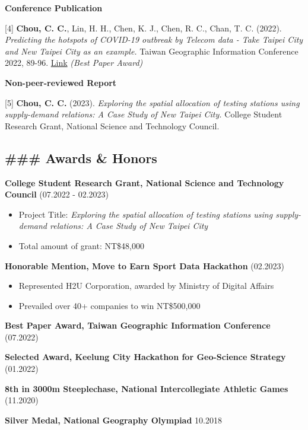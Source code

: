 \textbf{Conference Publication}

{[}4{]} \textbf{Chou, C. C.}, Lin, H. H., Chen, K. J., Chen, R. C.,
Chan, T. C. (2022). \emph{Predicting the hotspots of COVID-19 outbreak
by Telecom data - Take Taipei City and New Taipei City as an example.}
Taiwan Geographic Information Conference 2022, 89-96.
\href{https://drive.google.com/file/d/1KBwXkAsi8dmpPls-F3Lp8rqz5oc2JKWW/view}{Link}
\emph{(Best Paper Award)}

\textbf{Non-peer-reviewed Report}

{[}5{]} \textbf{Chou, C. C.} (2023). \emph{Exploring the spatial
allocation of testing stations using supply-demand relations: A Case
Study of New Taipei City.} College Student Research Grant, National
Science and Technology Council.

\subsection{\#\#\# Awards \& Honors}\label{awards-honors}

\textbf{College Student Research Grant, National Science and Technology
Council} (07.2022 - 02.2023)

\begin{itemize}
\item
  Project Title: \emph{Exploring the spatial allocation of testing
  stations using supply-demand relations: A Case Study of New Taipei
  City}
\item
  Total amount of grant: NT\$48,000
\end{itemize}

\textbf{Honorable Mention, Move to Earn Sport Data Hackathon} (02.2023)

\begin{itemize}
\item
  Represented H2U Corporation, awarded by Ministry of Digital Affairs
\item
  Prevailed over 40+ companies to win NT\$500,000
\end{itemize}

\textbf{Best Paper Award, Taiwan Geographic Information Conference}
(07.2022)

\textbf{Selected Award, Keelung City Hackathon for Geo-Science Strategy}
(01.2022)

\textbf{8th in 3000m Steeplechase, National Intercollegiate Athletic
Games} (11.2020)

\textbf{Silver Medal, National Geography Olympiad} 10.2018

